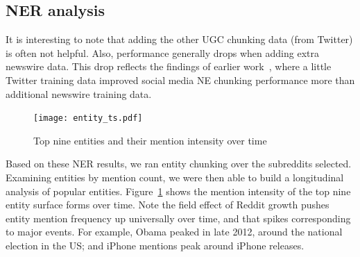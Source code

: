 \documentclass[sigconf]{acmart}
\begin{document}




\iffalse
\subsection{NER analysis}%

It is interesting to note that adding the other UGC chunking data (from Twitter) is often not helpful.
Also, performance generally drops when adding extra newswire data.
This drop reflects the findings of earlier work~\cite{ritter2011named}, where a little Twitter training data improved social media NE chunking performance more than additional newswire training data.

\begin{figure}
\begin{center}
\texttt{[image: entity\_ts.pdf]}
\caption{Top nine entities and their mention intensity over time}
\label{fig:entity-ts}
\end{center}
\end{figure}

Based on these NER results, we ran entity chunking over the subreddits selected.
Examining entities by mention count, we were then able to build a longitudinal analysis of popular entities.
Figure~\ref{fig:entity-ts} shows the mention intensity of the top nine entity surface forms over time.
Note the field effect of Reddit growth pushes entity mention frequency up universally over time, and that spikes corresponding to major events.
For example, Obama peaked in late 2012, around the national election in the US; and iPhone mentions peak around iPhone releases.
\end{document}
